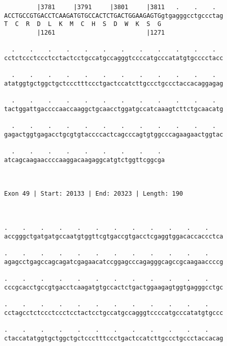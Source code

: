 \documentclass{article}
\begin{document}
\begin{Verbatim}
         |3781     |3791     |3801     |3811   .    .    .  
ACCTGCCGTGACCTCAAGATGTGCCACTCTGACTGGAAGAGTGgtgagggcctgccctag
T  C  R  D  L  K  M  C  H  S  D  W  K  S  G                 
         |1261                         |1271                
  
  .    .    .    .    .    .    .    .    .    .    .    .  
cctctccctccctcctactcctgccatgccagggtccccatgcccatatgtgcccctacc
                                                            
  .    .    .    .    .    .    .    .    .    .    .    .  
atatggtgctggctgctccctttccctgactccatcttgccctgccctaccacaggagag
                                                            
  .    .    .    .    .    .    .    .    .    .    .    .  
tactggattgaccccaaccaaggctgcaacctggatgccatcaaagtcttctgcaacatg
                                                            
  .    .    .    .    .    .    .    .    .    .    .    .  
gagactggtgagacctgcgtgtaccccactcagcccagtgtggcccagaagaactggtac
                                                            
  .    .    .    .    .    .    .    .    . 
atcagcaagaaccccaaggacaagaggcatgtctggttcggcga
                                            
                                            
 
Exon 49 | Start: 20133 | End: 20323 | Length: 190



.    .    .    .    .    .    .    .    .    .    .    .    
accgggctgatgatgccaatgtggttcgtgaccgtgacctcgaggtggacaccaccctca
                                                            
.    .    .    .    .    .    .    .    .    .    .    .    
agagcctgagccagcagatcgagaacatccggagcccagagggcagccgcaagaaccccg
                                                            
.    .    .    .    .    .    .    .    .    .    .    .    
cccgcacctgccgtgacctcaagatgtgccactctgactggaagagtggtgagggcctgc
                                                            
.    .    .    .    .    .    .    .    .    .    .    .    
cctagcctctccctccctcctactcctgccatgccagggtccccatgcccatatgtgccc
                                                            
.    .    .    .    .    .    .    .    .    .    .    .    
ctaccatatggtgctggctgctccctttccctgactccatcttgccctgccctaccacag
                                                            

\end{Verbatim}
\end{document}
